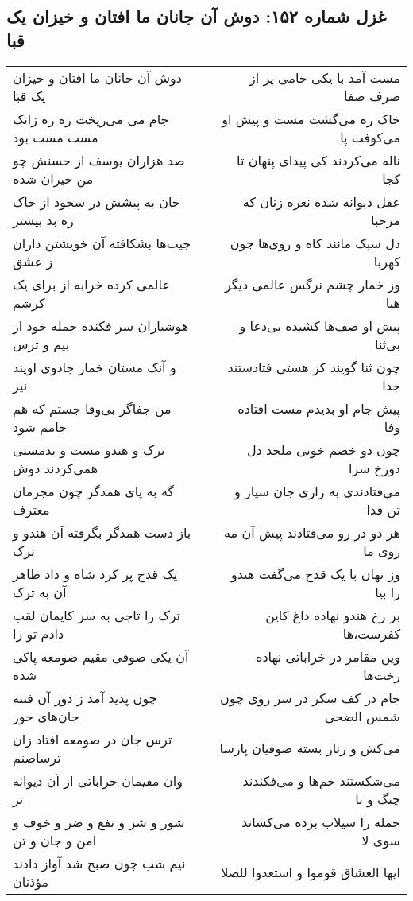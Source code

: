 \begin{center}
\section*{غزل شماره ۱۵۲: دوش آن جانان ما افتان و خیزان یک قبا}
\label{sec:0152}
\begin{longtable}{l p{0.5cm} r}
دوش آن جانان ما افتان و خیزان یک قبا
&&
مست آمد با یکی جامی پر از صرف صفا
\\
جام می می‌ریخت ره ره زانک مست مست بود
&&
خاک ره می‌گشت مست و پیش او می‌کوفت پا
\\
صد هزاران یوسف از حسنش چو من حیران شده
&&
ناله می‌کردند کی پیدای پنهان تا کجا
\\
جان به پیشش در سجود از خاک ره بد بیشتر
&&
عقل دیوانه شده نعره زنان که مرحبا
\\
جیب‌ها بشکافته آن خویشتن داران ز عشق
&&
دل سبک مانند کاه و روی‌ها چون کهربا
\\
عالمی کرده خرابه از برای یک کرشم
&&
وز خمار چشم نرگس عالمی دیگر هبا
\\
هوشیاران سر فکنده جمله خود از بیم و ترس
&&
پیش او صف‌ها کشیده بی‌دعا و بی‌ثنا
\\
و آنک مستان خمار جادوی اویند نیز
&&
چون ثنا گویند کز هستی فتادستند جدا
\\
من جفاگر بی‌وفا جستم که هم جامم شود
&&
پیش جام او بدیدم مست افتاده وفا
\\
ترک و هندو مست و بدمستی همی‌کردند دوش
&&
چون دو خصم خونی ملحد دل دوزخ سزا
\\
گه به پای همدگر چون مجرمان معترف
&&
می‌فتادندی به زاری جان سپار و تن فدا
\\
باز دست همدگر بگرفته آن هندو و ترک
&&
هر دو در رو می‌فتادند پیش آن مه روی ما
\\
یک قدح پر کرد شاه و داد ظاهر آن به ترک
&&
وز نهان با یک قدح می‌گفت هندو را بیا
\\
ترک را تاجی به سر کایمان لقب دادم تو را
&&
بر رخ هندو نهاده داغ کاین کفرست،ها
\\
آن یکی صوفی مقیم صومعه پاکی شده
&&
وین مقامر در خراباتی نهاده رخت‌ها
\\
چون پدید آمد ز دور آن فتنه جان‌های حور
&&
جام در کف سکر در سر روی چون شمس الضحی
\\
ترس جان در صومعه افتاد زان ترساصنم
&&
می‌کش و زنار بسته صوفیان پارسا
\\
وان مقیمان خراباتی از آن دیوانه تر
&&
می‌شکستند خم‌ها و می‌فکندند چنگ و نا
\\
شور و شر و نفع و ضر و خوف و امن و جان و تن
&&
جمله را سیلاب برده می‌کشاند سوی لا
\\
نیم شب چون صبح شد آواز دادند مؤذنان
&&
ایها العشاق قوموا و استعدوا للصلا
\\
\end{longtable}
\end{center}
